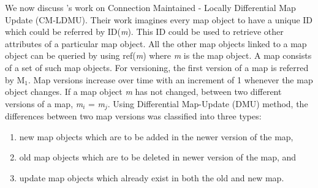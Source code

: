 We now discuss \citet{asahara2008locally}'s work on Connection Maintained - Locally Differential Map Update (CM-LDMU). Their work imagines every map object to have a unique ID which could be referred by ID(\textit{m}). This ID could be used to retrieve other attributes of a particular map object. All the other map objects linked to a map object can be queried by using ref(\textit{m}) where \textit{m} is the map object. A map consists of a set of such map objects. For versioning, the first version of a map is referred by M$_{1}$. Map versions increase over time with an increment of 1 whenever the map object changes. If a map object \textit{m} has not changed, between two different versions of a map, \textit{m}$_{i}$ = \textit{m}$_{j}$. Using Differential Map-Update (DMU) method, the differences between two map versions was classified into three types: 
\begin{enumerate}
\item new map objects which are to be added in the newer version of the map,
\item old map objects which are to be deleted in newer version of the map, and 
\item update map objects which already exist in both the old and new map.
\end{enumerate}
